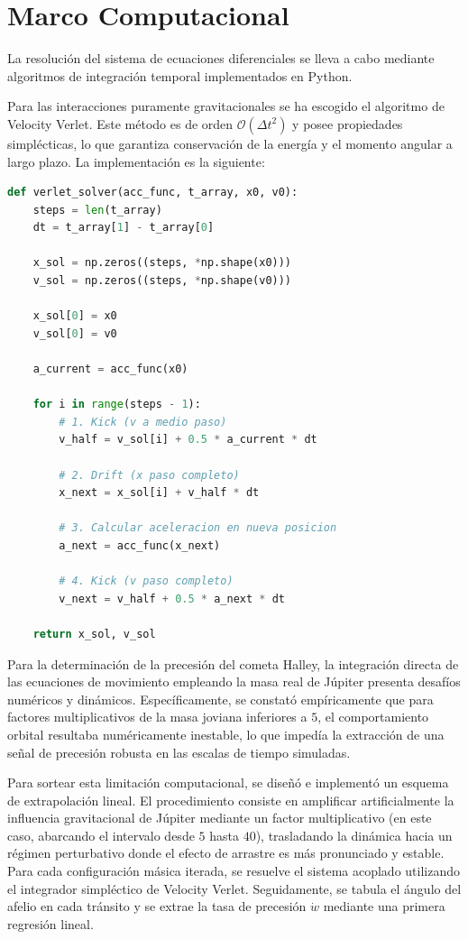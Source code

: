 \section{Marco Computacional}
La resolución del sistema de ecuaciones diferenciales se lleva a cabo mediante algoritmos de integración temporal implementados en Python. 

Para las interacciones puramente gravitacionales se ha escogido el algoritmo de Velocity Verlet. Este método es de orden $\mathcal{O}(\Delta t^2)$ y posee propiedades simplécticas, lo que garantiza conservación de la energía y el momento angular a largo plazo. La implementación es la siguiente:

\begin{lstlisting}[language=Python, caption={Implementación del método de Velocity-Verlet.}]
def verlet_solver(acc_func, t_array, x0, v0):
    steps = len(t_array)
    dt = t_array[1] - t_array[0]
    
    x_sol = np.zeros((steps, *np.shape(x0)))
    v_sol = np.zeros((steps, *np.shape(v0)))
    
    x_sol[0] = x0
    v_sol[0] = v0
    
    a_current = acc_func(x0)
    
    for i in range(steps - 1):
        # 1. Kick (v a medio paso)
        v_half = v_sol[i] + 0.5 * a_current * dt
        
        # 2. Drift (x paso completo)
        x_next = x_sol[i] + v_half * dt
        
        # 3. Calcular aceleracion en nueva posicion
        a_next = acc_func(x_next)
        
        # 4. Kick (v paso completo)
        v_next = v_half + 0.5 * a_next * dt
        
    return x_sol, v_sol
\end{lstlisting}

Para la determinación de la precesión del cometa Halley, la integración directa de las ecuaciones de movimiento empleando la masa real de Júpiter presenta desafíos numéricos y dinámicos. Específicamente, se constató empíricamente que para factores multiplicativos de la masa joviana inferiores a $5$, el comportamiento orbital resultaba numéricamente inestable, lo que impedía la extracción de una señal de precesión robusta en las escalas de tiempo simuladas. 

Para sortear esta limitación computacional, se diseñó e implementó un esquema de extrapolación lineal. El procedimiento consiste en amplificar artificialmente la influencia gravitacional de Júpiter mediante un factor multiplicativo  (en este caso, abarcando el intervalo desde $5$ hasta $40$), trasladando la dinámica hacia un régimen perturbativo donde el efecto de arrastre es más pronunciado y estable. Para cada configuración másica iterada, se resuelve el sistema acoplado utilizando el integrador simpléctico de Velocity Verlet. Seguidamente, se tabula el ángulo del afelio en cada tránsito y se extrae la tasa de precesión $\dot{w}$ mediante una primera regresión lineal. 

